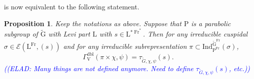 \documentclass[12pt, reqno]{amsart}
\newtheorem{proposition}[theorem]{Proposition}
\theoremstyle{definition}
\theoremstyle{definition}
\theoremstyle{definition}
\newcommand{\hermitianSpace}{\mathrm{V}}
\newcommand{\fieldCharacter}{\psi}
\newcommand{\Ind}[3]{\mathrm{Ind}_{#1}^{#2}\left(#3\right)}
\newcommand{\GroupExtension}[1]{\widetilde{#1}}
\newcommand{\Frobenius}{\operatorname{Fr}}
\newcommand{\dblGammaFactorSpace}[4]{\Gamma^{\mathrm{dbl}}_{#1}\left(#2 \times #3, #4\right)}
\newcommand{\algebraicGroup}[1]{\boldsymbol{\mathrm{#1}}}
\newcommand{\LusztigSeries}[2]{\mathcal{E}\left(#1, (#2)\right)}
\newcommand{\DualFrobeniusFixedPoints}[2][\Frobenius^{\ast}]{\algebraicGroup{#2}^{\ast #1}}
\newcommand{\FrobeniusFixedPoints}[2][\Frobenius]{\algebraicGroup{#2}^{#1}}
\newcommand{\elad}[1]{\textcolor{blue}{\sffamily ((ELAD: #1))}}
\begin{document}
 is now equivalent to the following statement.
\begin{proposition}\label{prop:gamma-factor-is-constant-on-lusztig-series}
	Keep the notations as above. Suppose that $\algebraicGroup{P}$ is a parabolic subgroup of $\algebraicGroup{\GroupExtension{G}}$ with Levi part $\algebraicGroup{L}$ with $s \in \DualFrobeniusFixedPoints{L}$. Then for any irreducible cuspidal $\sigma \in \LusztigSeries{\FrobeniusFixedPoints{L}}{s}$ and for any irreducible subrepresentation $\pi \subset \Ind{\FrobeniusFixedPoints{P}}{\FrobeniusFixedPoints{\GroupExtension{G}}}{\sigma}$, $$\dblGammaFactorSpace{\hermitianSpace}{\pi}{\chi}{\fieldCharacter} = \tau_{\GroupExtension{G}, \chi, \fieldCharacter}\left(s\right).$$
	\elad{Many things are not defined anymore. Need to define $\tau_{\GroupExtension{G}, \chi, \fieldCharacter}\left(s\right)$, etc.}
\end{proposition}
\end{document}
